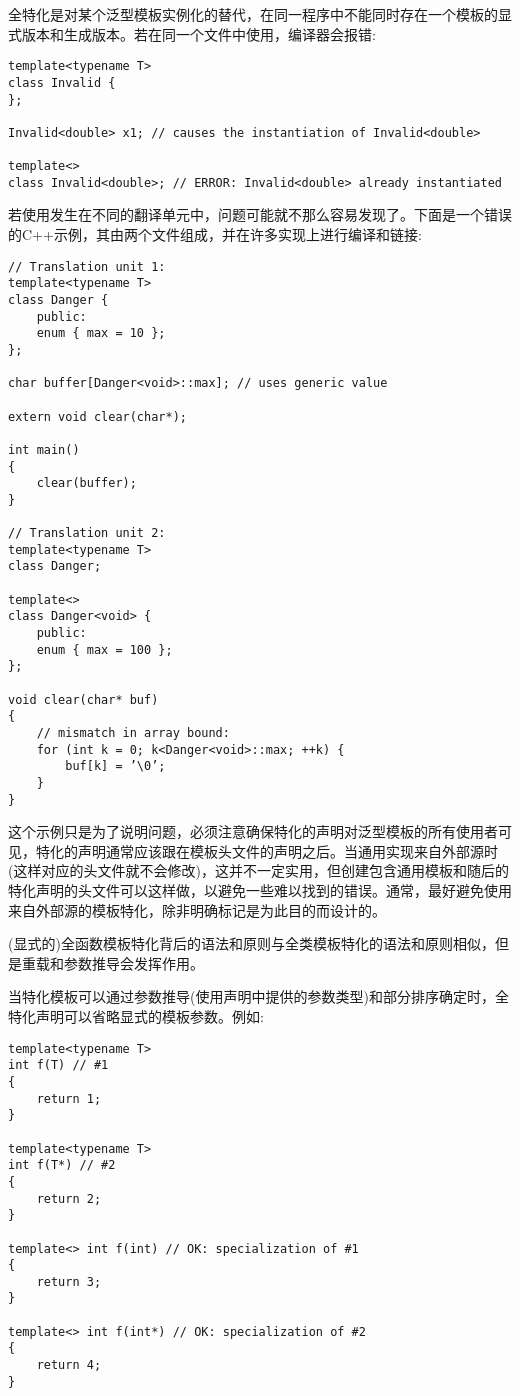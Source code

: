 全特化是对某个泛型模板实例化的替代，在同一程序中不能同时存在一个模板的显式版本和生成版本。若在同一个文件中使用，编译器会报错:

\begin{lstlisting}[style=styleCXX]
template<typename T>
class Invalid {
};

Invalid<double> x1; // causes the instantiation of Invalid<double>

template<>
class Invalid<double>; // ERROR: Invalid<double> already instantiated
\end{lstlisting}

若使用发生在不同的翻译单元中，问题可能就不那么容易发现了。下面是一个错误的C++示例，其由两个文件组成，并在许多实现上进行编译和链接:

\begin{lstlisting}[style=styleCXX]
// Translation unit 1:
template<typename T>
class Danger {
	public:
	enum { max = 10 };
};

char buffer[Danger<void>::max]; // uses generic value

extern void clear(char*);

int main()
{
	clear(buffer);
}

// Translation unit 2:
template<typename T>
class Danger;

template<>
class Danger<void> {
	public:
	enum { max = 100 };
};

void clear(char* buf)
{
	// mismatch in array bound:
	for (int k = 0; k<Danger<void>::max; ++k) {
		buf[k] = ’\0’;
	}
}
\end{lstlisting}

这个示例只是为了说明问题，必须注意确保特化的声明对泛型模板的所有使用者可见，特化的声明通常应该跟在模板头文件的声明之后。当通用实现来自外部源时(这样对应的头文件就不会修改)，这并不一定实用，但创建包含通用模板和随后的特化声明的头文件可以这样做，以避免一些难以找到的错误。通常，最好避免使用来自外部源的模板特化，除非明确标记是为此目的而设计的。


(显式的)全函数模板特化背后的语法和原则与全类模板特化的语法和原则相似，但是重载和参数推导会发挥作用。

当特化模板可以通过参数推导(使用声明中提供的参数类型)和部分排序确定时，全特化声明可以省略显式的模板参数。例如:

\begin{lstlisting}[style=styleCXX]
template<typename T>
int f(T) // #1
{
	return 1;
}

template<typename T>
int f(T*) // #2
{
	return 2;
}

template<> int f(int) // OK: specialization of #1
{
	return 3;
}

template<> int f(int*) // OK: specialization of #2
{
	return 4;
}
\end{lstlisting}

